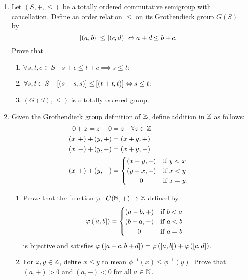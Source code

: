 \documentclass[master.tex]{subfiles}
\begin{document}
\begin{enumerate}
    \item Let $(S, +, \leq)$ be a totally ordered commutative semigroup with cancellation.
    Define an order relation $\leq$ on its Grothendieck group $G(S)$ by
    \[
        \left[ (a, b) \right] \leq \left[ (c, d) \right] \Leftrightarrow a + d \leq b + c
    .\]
    Prove that
    \begin{enumerate}
        \item $\forall s, t, c \in S \quad s + c \leq t + c \implies s \leq t$;
        \item $\forall s,t \in S \quad \left[ (s + s, s) \right] \leq \left[ (t + t, t) \right] \Leftrightarrow s \leq t$;
        \item $(G(S), \leq)$ is a totally ordered group.
    \end{enumerate}
    
    \item Given the Grothendieck group definition of $\mathbb{Z}$, define addition in $\mathbb{Z}$ as follows:
    \begin{align*}
        0 + z = z + 0 &= z \quad \forall z \in \Z \\
        (x, +) + (y, +) &= (x + y, +) \\
        (x, -) + (y, -) &= (x + y, -) \\
        (x, +) + (y, -) &=
        \begin{cases}
            (x - y, +) &\text{if } y < x \\
            (y - x, -) &\text{if } x < y \\
            \hfil 0 &\text{if } x = y.
        \end{cases}
    \end{align*}
    \begin{enumerate}
        \item Prove that the function $\varphi : G(\mathbb{N}, +) \rightarrow \mathbb{Z}$ defined by
        \[
            \phi\left(\eqclass{a, b}\right) =
            \begin{cases}
                (a - b, +) &\text{if } b < a \\
                (b - a, -) &\text{if } a < b \\
                \hfil 0 &\text{if } a = b
            \end{cases}
        \]
        is bijective and satisfies $\varphi\left(\left[ a + c, b + d \right]\right) = \varphi\left(\left[ a, b \right]\right) + \varphi\left(\left[ c, d \right]\right)$.

        \item For $x, y \in \mathbb{Z}$, define $x \leq y$ to mean $\phi^{-1}(x) \leq \phi^{-1}(y)$.
        Prove that $(a, +) > 0$ and $(a, -) < 0$ for all $a \in \mathbb{N}$.
    \end{enumerate}


\end{enumerate}
\end{document}
